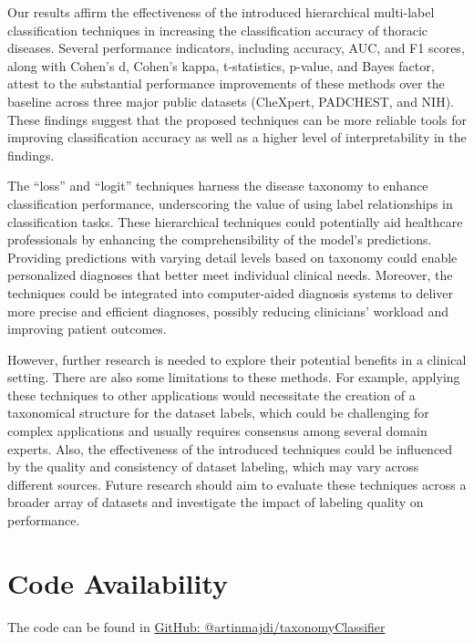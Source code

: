 \documentclass[review,1p,times,numbers]{elsarticle}
\begin{document}
Our results affirm the effectiveness of the introduced hierarchical multi-label classification techniques in increasing the classification accuracy of thoracic diseases. Several performance indicators, including accuracy, AUC, and F1 scores, along with Cohen's d, Cohen's kappa, t-statistics, p-value, and Bayes factor, attest to the substantial performance improvements of these methods over the baseline across three major public datasets (CheXpert, PADCHEST, and NIH). These findings suggest that the proposed techniques can be more reliable tools for improving classification accuracy as well as a higher level of interpretability in the findings.

The ``loss'' and ``logit'' techniques harness the disease taxonomy to enhance classification performance, underscoring the value of using label relationships in classification tasks. These hierarchical techniques could potentially aid healthcare professionals by enhancing the comprehensibility of the model's predictions. Providing predictions with varying detail levels based on taxonomy could enable personalized diagnoses that better meet individual clinical needs. Moreover, the techniques could be integrated into computer-aided diagnosis systems to deliver more precise and efficient diagnoses, possibly reducing clinicians' workload and improving patient outcomes.

However, further research is needed to explore their potential benefits in a clinical setting. There are also some limitations to these methods. For example, applying these techniques to other applications would necessitate the creation of a taxonomical structure for the dataset labels, which could be challenging for complex applications and usually requires consensus among several domain experts. Also, the effectiveness of the introduced techniques could be influenced by the quality and consistency of dataset labeling, which may vary across different sources. Future research should aim to evaluate these techniques across a broader array of datasets and investigate the impact of labeling quality on performance.

\section*{Code Availability}
The code can be found in \href{https://github.com/artinmajdi/taxonomyClassifier}{GitHub: @artinmajdi/taxonomyClassifier}

% 

\end{document}
